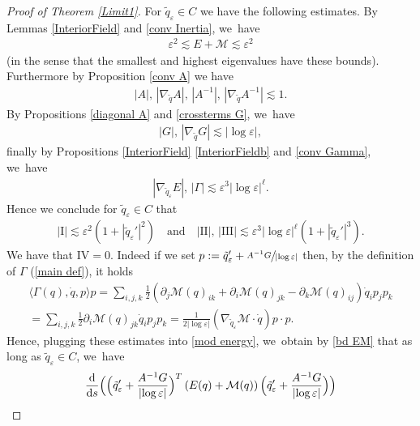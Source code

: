 \documentclass[10pt]{amsart}
\let\epsilon\varepsilon
\newcommand{\rI}{\mathrm{I}}
\newcommand{\rII}{\mathrm{II}}
\newcommand{\rIII}{\mathrm{III}}
\newcommand{\rIV}{\mathrm{IV}}
\theoremstyle{definition}
\newcommand\eq{=}
\let\de\partial
\let\eps\epsilon
\let\mel\relax
\begin{document}
\begin{proof}[Proof of Theorem \ref{Limit1}]
For $\tilde{q}_\eps\in C$ we have the following estimates. 
By Lemmas \ref{InteriorField} and \ref{conv Inertia}, we~have\vspace*{-3pt}
\begin{align}\label{bd EM}
\eps^2\lesssim E+\mathcal{M}\lesssim \eps^2
\end{align}
(in the sense that the smallest and highest eigenvalues have these bounds). Furthermore by Proposition \ref{conv A} we have\vspace*{-3pt}
\begin{align}\label{bd A}
|A|,\,|\nabla_{\tilde{q}}A|,\, |A^{-1}|,\,|\nabla_{\tilde{q}}A^{-1}|\lesssim 1.
\end{align}
By Propositions \ref{diagonal A} and \ref{crossterms G}, we~have\vspace*{-3pt}
\begin{align}\label{bd G}
|G|,\, |\nabla_{\tilde{q}} G|\lesssim |{\log\eps}|,
\end{align}
finally by Propositions \ref{InteriorField} \eqref{InteriorFieldb} and \ref{conv Gamma}, we~have\vspace*{-3pt}
\begin{align}\label{bd deri M}
|\nabla_{\tilde{q}_\eps}E|,\,|\Gamma|\lesssim \eps^3|{\log\eps}|^\ell.
\end{align}
Hence we conclude for $\tilde{q}_\eps\in C$ that
\begin{align*}
|\rI|\lesssim \eps^2(1+|\tilde{q}_\eps'|^2)\quad\text{and}\quad
|\rII|,\,|\rIII|\lesssim \eps^3|{\log\eps}|^\ell(1+|\tilde{q}_\eps'|^3).
\end{align*}
We have that $\rIV=0$. Indeed if we set $p:=\tilde{q}_\eps'+\sfrac{A^{-1}G}{|{\log\eps}|}$ then, by the definition of $\Gamma$ (\ref{main def}), it holds
\begin{align*}
\langle\Gamma(q),\dot{q},p\rangle p\eq\sum_{i,j,k}\frac{1}{2}(\de_j\mathcal{M}(q)_{ik}+\de_i\mathcal{M}(q)_{jk}-\de_k\mathcal{M}(q)_{ij})\dot{q}_ip_jp_k\\
=\sum_{i,j,k}\frac{1}{2}\de_i\mathcal{M}(q)_{jk}\dot{q}_ip_jp_k\eq\frac{1}{2|{\log\eps}|}(\nabla_{\tilde{q}_\eps}\mathcal{M}\cdot\dot{q})p\cdot p.
\end{align*}
Hence, plugging these estimates into \eqref{mod energy}, we~obtain by \eqref{bd EM} that as long as $\tilde{q}_\eps\in C$, we~have
\begin{multline}\label{1st Gronwall}
\mel\frac{\text{d}}{\text{d}s} \Bigl(\Bigl(\tilde{q}_\eps'+\frac{A^{-1}G}{|{\log\eps}|} \Bigr)^T\left(E(q)+\mathcal{M}(q)\right) \Bigl(\tilde{q}_\eps'+\frac{A^{-1}G}{|{\log\eps}|} \Bigr) \Bigr)\\

\end{multline}
\end{proof}
\end{document}
